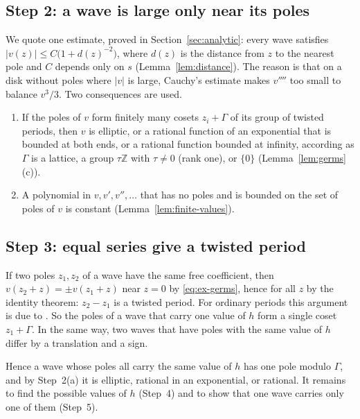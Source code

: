 \documentclass[11pt]{article}
\theoremstyle{definition}
\theoremstyle{remark}
\numberwithin{equation}{section}
\newcommand{\ZZ}{\mathbb Z}
\begin{document}
\subsection{Step 2: a wave is large only near its poles}\label{sec:ex-estimate}

We quote one estimate, proved in Section~\ref{sec:analytic}: every wave
satisfies
\(|v(z)|\le C\bigl(1+d(z)^{-2}\bigr)\), where \(d(z)\) is the distance
from \(z\) to the nearest pole and \(C\) depends only on \(s\)
(Lemma~\ref{lem:distance}). The reason is that on a disk without poles
where \(|v|\) is large, Cauchy's estimate makes \(v''''\) too small to
balance \(v^3/3\). Two consequences are used.
\begin{enumerate}[label=\textup{(\alph*)},leftmargin=2.2em]
\item If the poles of \(v\) form finitely many cosets \(z_i+\Gamma\) of
its group of twisted periods, then \(v\) is elliptic, or a rational
function of an exponential that is bounded at both ends, or a rational
function bounded at infinity, according as \(\Gamma\) is a lattice, a
group \(\tau\ZZ\) with \(\tau\ne0\) (rank one), or \(\{0\}\)
(Lemma~\ref{lem:germs}(c)).
\item A polynomial in \(v,v',v'',\dots\) that has no poles and is
bounded on the set of poles of \(v\) is constant
(Lemma~\ref{lem:finite-values}).
\end{enumerate}

\subsection{Step 3: equal series give a twisted period}\label{sec:ex-global}

If two poles \(z_1,z_2\) of a wave have the same free coefficient, then
\(v(z_2+z)=\pm v(z_1+z)\) near \(z=0\) by \eqref{eq:ex-germs}, hence
for all \(z\) by the identity theorem: \(z_2-z_1\) is a twisted period.
For ordinary periods this argument is due to
\citet{Eremenko1982,Eremenko2006}. So the poles of a wave that carry
one value of \(h\) form a single coset \(z_1+\Gamma\). In the same way, two waves that have poles with
the same value of \(h\) differ by a translation and a sign.

Hence a wave whose poles all carry the same value of \(h\) has one pole
modulo \(\Gamma\), and by Step~2(a) it is elliptic, rational in an
exponential, or rational. It remains to find the possible values of
\(h\) (Step~4) and to show that one wave carries only one of them
(Step~5).
\end{document}
